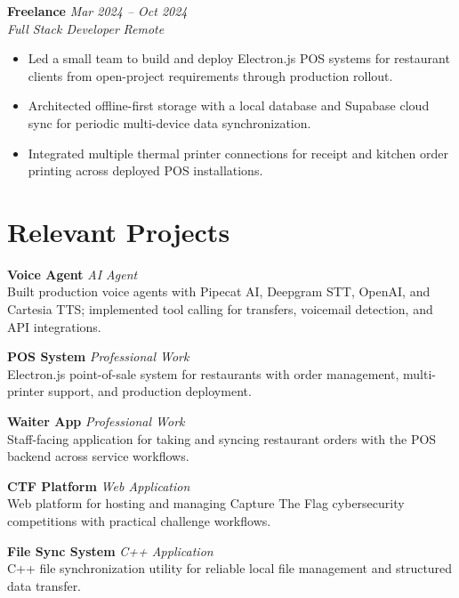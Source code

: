 \documentclass[11pt,a4paper]{article}
\newcommand{\resumeSubheading}[4]{%
  \textbf{#1} \hfill \textit{#2} \\
  \textit{#3} \hfill \textit{#4} \\
}
\newcommand{\resumeItemList}{\begin{itemize}[leftmargin=*, nosep, topsep=2pt]}
\newcommand{\resumeItemListEnd}{\end{itemize}}
\begin{document}
\vspace{4pt}

\resumeSubheading{Freelance}{Mar 2024 -- Oct 2024}{Full Stack Developer}{Remote}
\resumeItemList
  \item Led a small team to build and deploy Electron.js POS systems for restaurant clients from open-project requirements through production rollout.
  \item Architected offline-first storage with a local database and Supabase cloud sync for periodic multi-device data synchronization.
  \item Integrated multiple thermal printer connections for receipt and kitchen order printing across deployed POS installations.
\resumeItemListEnd

\section{Relevant Projects}

\textbf{Voice Agent} \hfill \textit{AI Agent} \\
Built production voice agents with Pipecat AI, Deepgram STT, OpenAI, and Cartesia TTS; implemented tool calling for transfers, voicemail detection, and API integrations.

\vspace{4pt}

\textbf{POS System} \hfill \textit{Professional Work} \\
Electron.js point-of-sale system for restaurants with order management, multi-printer support, and production deployment.

\vspace{4pt}

\textbf{Waiter App} \hfill \textit{Professional Work} \\
Staff-facing application for taking and syncing restaurant orders with the POS backend across service workflows.

\vspace{4pt}

\textbf{CTF Platform} \hfill \textit{Web Application} \\
Web platform for hosting and managing Capture The Flag cybersecurity competitions with practical challenge workflows.

\vspace{4pt}

\textbf{File Sync System} \hfill \textit{C++ Application} \\
C++ file synchronization utility for reliable local file management and structured data transfer.
\end{document}
